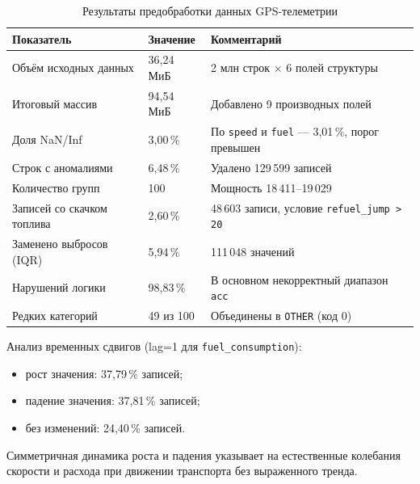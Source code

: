 \documentclass[oneside,a4paper,14pt]{extarticle}
\begin{document}
\begin{table}[H]
	\centering
	\caption{Результаты предобработки данных GPS-телеметрии}
	\label{tab:metrics}
	\renewcommand{\arraystretch}{1.2}
	\begin{tabular}{|p{4.6cm}|p{2.9cm}|p{8.3cm}|}
		\hline
		Показатель & Значение & Комментарий \\
		\hline
		Объём исходных данных & 36,24 МиБ & 2 млн строк $\times$ 6 полей структуры \\
		\hline
		Итоговый массив & 94,54 МиБ & Добавлено 9 производных полей \\
		\hline
		Доля NaN/Inf & 3,00\,\% & По \texttt{speed} и \texttt{fuel} --- 3,01\,\%, порог превышен \\
		\hline
		Строк с аномалиями & 6,48\,\% & Удалено 129\,599 записей \\
		\hline
		Количество групп & 100 & Мощность 18\,411--19\,029 \\
		\hline
		Записей со скачком топлива & 2,60\,\% & 48\,603 записи, условие \texttt{refuel\_jump > 20} \\
		\hline
		Заменено выбросов (IQR) & 5,94\,\% & 111\,048 значений \\
		\hline
		Нарушений логики & 98,83\,\% & В основном некорректный диапазон \texttt{acc} \\
		\hline
		Редких категорий & 49 из 100 & Объединены в \texttt{OTHER} (код 0) \\
		\hline
	\end{tabular}
\end{table}

Анализ временных сдвигов (lag=1 для \texttt{fuel\_consumption}):
\begin{itemize}[leftmargin=*]
	\item рост значения: 37,79\,\% записей;
	\item падение значения: 37,81\,\% записей;
	\item без изменений: 24,40\,\% записей.
\end{itemize}
Симметричная динамика роста и падения указывает на естественные колебания скорости и расхода при движении транспорта без выраженного тренда.
\end{document}
